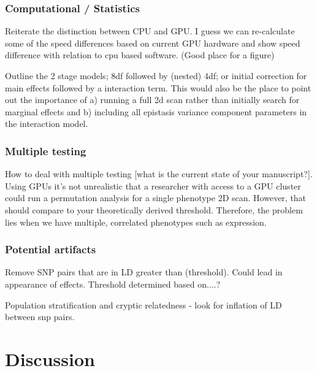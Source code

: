 \documentclass{article}
\begin{document}
\subsubsection{Computational / Statistics}

Reiterate the distinction between CPU and GPU. I guess we can re-calculate some of the speed differences based on current GPU hardware and show speed difference with relation to cpu based software. (Good place for a figure)

Outline the 2 stage models; 8df followed by (nested) 4df; or initial correction for main effects followed by a interaction term. This would also be the place to point out the importance of a) running a full 2d scan rather than initially search for marginal effects and b) including all epistasis variance component parameters in the interaction model. 

\subsubsection{Multiple testing}

How to deal with multiple testing [what is the current state of your manuscript?]. Using GPUs it's not unrealistic that a researcher with access to a GPU cluster could run a permutation analysis for a single phenotype 2D scan. However, that should compare to your theoretically derived threshold. Therefore, the problem lies when we have multiple, correlated phenotypes such as expression. 

\subsubsection{Potential artifacts}

Remove SNP pairs that are in LD greater than (threshold). Could lead in appearance of effects. Threshold determined based on....?

Population stratification and cryptic relatedness - look for inflation of LD between snp pairs.


\section{Discussion}
\end{document}
